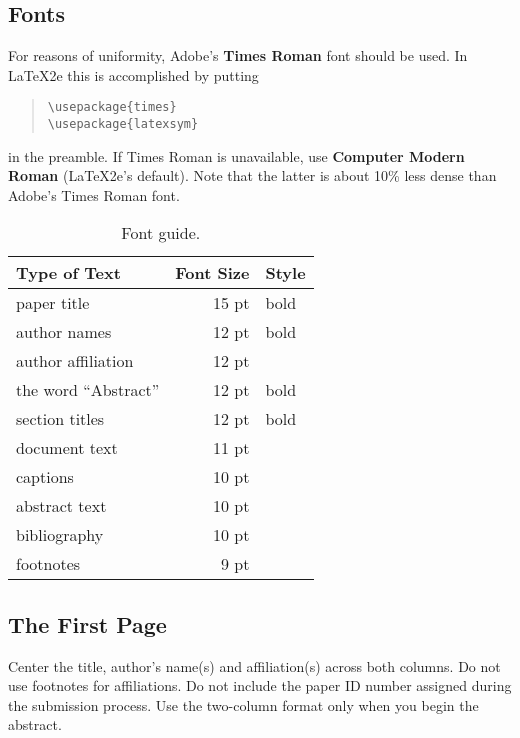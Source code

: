 \documentclass[11pt,a4paper]{article}
\begin{document}
\subsection{Fonts}

For reasons of uniformity, Adobe's {\bf Times Roman} font should be
used. In \LaTeX2e{} this is accomplished by putting

\begin{quote}
\begin{verbatim}
\usepackage{times}
\usepackage{latexsym}
\end{verbatim}
\end{quote}
in the preamble. If Times Roman is unavailable, use {\bf Computer
  Modern Roman} (\LaTeX2e{}'s default).  Note that the latter is about
  10\% less dense than Adobe's Times Roman font.

\begin{table}[t!]
\begin{center}
\begin{tabular}{|l|rl|}
\hline \bf Type of Text & \bf Font Size & \bf Style \\ \hline
paper title & 15 pt & bold \\
author names & 12 pt & bold \\
author affiliation & 12 pt & \\
the word ``Abstract'' & 12 pt & bold \\
section titles & 12 pt & bold \\
document text & 11 pt  &\\
captions & 10 pt & \\
abstract text & 10 pt & \\
bibliography & 10 pt & \\
footnotes & 9 pt & \\
\hline
\end{tabular}
\end{center}
\caption{\label{font-table} Font guide. }
\end{table}

\subsection{The First Page}
\label{ssec:first}

Center the title, author's name(s) and affiliation(s) across both
columns. Do not use footnotes for affiliations. Do not include the
paper ID number assigned during the submission process. Use the
two-column format only when you begin the abstract.
\end{document}
